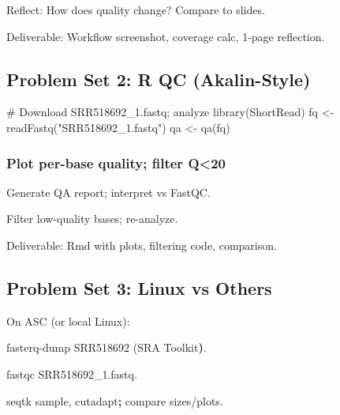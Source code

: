 \documentclass[
  letterpaper,
  DIV=11,
  numbers=noendperiod]{scrreprt}
\newenvironment{Shaded}{\begin{snugshade}}{\end{snugshade}}
\newcommand{\BuiltInTok}[1]{\textcolor[rgb]{0.00,0.23,0.31}{#1}}
\newcommand{\CommentTok}[1]{\textcolor[rgb]{0.37,0.37,0.37}{#1}}
\newcommand{\ErrorTok}[1]{\textcolor[rgb]{0.68,0.00,0.00}{#1}}
\newcommand{\ExtensionTok}[1]{\textcolor[rgb]{0.00,0.23,0.31}{#1}}
\newcommand{\FunctionTok}[1]{\textcolor[rgb]{0.28,0.35,0.67}{#1}}
\newcommand{\KeywordTok}[1]{\textcolor[rgb]{0.00,0.23,0.31}{\textbf{#1}}}
\newcommand{\NormalTok}[1]{\textcolor[rgb]{0.00,0.23,0.31}{#1}}
\newcommand{\OtherTok}[1]{\textcolor[rgb]{0.00,0.23,0.31}{#1}}
\newcommand{\StringTok}[1]{\textcolor[rgb]{0.13,0.47,0.30}{#1}}
\begin{document}
Reflect: How does quality change? Compare to slides.\hspace{0pt}

Deliverable: Workflow screenshot, coverage calc, 1-page reflection.

\subsection{Problem Set 2: R QC
(Akalin-Style)}\label{problem-set-2-r-qc-akalin-style}

\begin{Shaded}
\begin{Highlighting}[]
\CommentTok{\# Download SRR518692\_1.fastq; analyze}
\FunctionTok{library}\NormalTok{(ShortRead)}
\NormalTok{fq }\OtherTok{\textless{}{-}} \FunctionTok{readFastq}\NormalTok{(}\StringTok{"SRR518692\_1.fastq"}\NormalTok{)}
\NormalTok{qa }\OtherTok{\textless{}{-}} \FunctionTok{qa}\NormalTok{(fq)}
\end{Highlighting}
\end{Shaded}

\subsubsection{Plot per-base quality; filter
Q\textless20}\label{plot-per-base-quality-filter-q20}

Generate QA report; interpret vs FastQC.

Filter low-quality bases; re-analyze.

Deliverable: Rmd with plots, filtering code, comparison.

\subsection{Problem Set 3: Linux vs
Others}\label{problem-set-3-linux-vs-others}

On ASC (or local Linux):\hspace{0pt}

\begin{Shaded}
\begin{Highlighting}[]
\ExtensionTok{fasterq{-}dump}\NormalTok{ SRR518692 }\ErrorTok{(}\ExtensionTok{SRA}\NormalTok{ Toolkit}\KeywordTok{)}\BuiltInTok{.}

\ExtensionTok{fastqc}\NormalTok{ SRR518692\_1.fastq.}

\ExtensionTok{seqtk}\NormalTok{ sample, cutadapt}\KeywordTok{;} \ExtensionTok{compare}\NormalTok{ sizes/plots.}
\end{Highlighting}
\end{Shaded}
\end{document}

